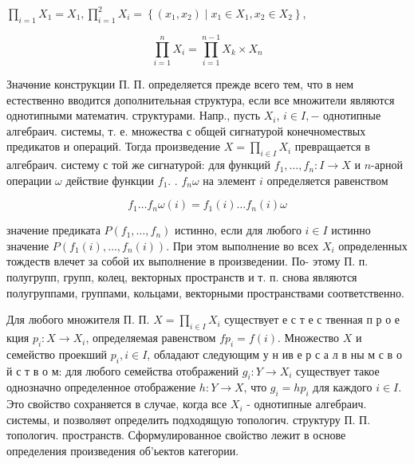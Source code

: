 \documentclass[10pt]{article}
\begin{document}
$\prod_{i=1} X_{1}=X_{1}, \prod_{i=1}^{2} X_{i}=\left\{\left(x_{1}, x_{2}\right) \mid x_{1} \in X_{1}, x_{2} \in X_{2}\right\}$,



\[

\prod_{i=1}^{n} X_{i}=\prod_{i=1}^{n-1} X_{k} \times X_{n}

\]



Значөние конструкции П. П. определяется прежде всего тем, что в нем естественно вводится дополнительная структура, если все множители являются однотипными математич. структурами. Напр., пусть $X_{i}$, $i \in I,-$ однотипные алгебраич. системы, т. е. множества с общей сигнатурой конечномествых предикатов и операций. Тогда произведение $X=\prod_{i \in I} X_{i}$ превращается в алгебраич. систему с той же сигнатурой: для функций $f_{1}, \ldots, f_{n}: I \rightarrow X$ и $n$-арной операции $\omega$ действие функции $f_{1}$. . $f_{n} \omega$ на элемент $i$ определяется равенством



\[

f_{1} \ldots f_{n} \omega(i)=f_{1}(i) \ldots f_{n}(i) \omega

\]



значение предиката $P\left(f_{1}, \ldots, f_{n}\right)$ истинно, если для любого $i \in I$ истинно значение $P\left(f_{1}(i), \ldots, f_{n}(i)\right)$. При этом выполнение во всех $X_{i}$ опрөделенных тождеств влечет за собой их выполнение в произведении. По- этому П. п. полугрупп, групп, колец, векторных пространств и т. п. снова являются полугруппами, группами, кольцами, векторными пространствами соответственно.



Для любого множителя П. П. $X=\prod_{i \in I} X_{i}$ существует е с т е с твенная п р о е кция $p_{i}: X \rightarrow X_{i}$, определяемая равенством $f p_{i}=f(i)$. Множество $X$ и семейство проекший $p_{i}, i \in I$, обладают следующим у н ив е р с а л в ны м с в о й с т в о м: для любого семейства отображений $g_{i}: Y \rightarrow X_{i}$ существует такое однозначно определенное отображение $h: Y \rightarrow X$, что $g_{i}=h p_{i}$ для каждого $i \in I$. Это свойство сохраняется в случае, когда все $X_{i}$ - однотипные алгебраич. системы, и позволяөт определить подходящую топологич. структуру П. П. топологич. пространств. Сформулированное свойство лежит в основе определения произведения об'ьектов категории.
\end{document}
